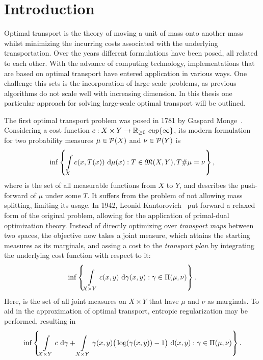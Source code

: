 \chapter*{Introduction}

Optimal transport is the theory of moving a unit of mass onto another mass whilst minimizing the incurring costs associated with the underlying transportation. Over the years different formulations have been posed, all related to each other. With the advance of computing technology, implementations that are based on optimal transport have entered application in various ways. One challenge this sets is the incorporation of large-scale problems, as previous algorithms do not scale well with increasing dimension. In this thesis one particular approach for solving large-scale optimal transport will be outlined.

The first optimal transport problem was posed in 1781 by Gaspard Monge\ \cite{Mon1781}. Considering a cost function $\map[c]{X \times Y}{\RZero \ cup \{ \infty \}}$, its modern formulation for two probability measures $\mu \in \PM{X}$ and $\nu \in \PM{Y}$ is
\[ \inf \left\{ \int\limits_X c(x, T(x))~\Dx{\mu} : T \in \MF{X}{Y}, \push{\mu} = \nu \right\}, \]
where  is the set of all measurable functions from $X$ to $Y$, and \push{\mu} describes the push-forward of $\mu$ under some $T$.
It suffers from the problem of not allowing mass splitting, limiting its usage. In 1942, Leonid Kantorovich\ \cite{Kan1942} put forward a relaxed form of the original problem, allowing for the application of primal-dual optimization theory. Instead of directly optimizing over \textit{transport maps} between two spaces, the objective now takes a joint measure, which attains the starting measures as its marginals, and assing a cost to the \textit{transport plan} by integrating the underlying cost function with respect to it:
\[ \inf \left\{ \int\limits_{X \times Y} c(x, y)~\Dx[x, y]{\gamma} : \gamma \in \TP{\mu}{\nu} \right\}. \]
Here, \TP{\mu}{\nu} is the set of all joint measures on $X \times Y$ that have $\mu$ and $\nu$ as marginals. To aid in the approximation of optimal transport, entropic regularization may be performed, resulting in
\[ \inf \left\{ \int\limits_{X \times Y} c~\D[\gamma] + \int\limits_{X \times Y} \gamma(x, y) \big( \log(\gamma(x, y)) - 1 \big)~\D[(x, y)] : \gamma \in \TP{\mu}{\nu} \right\}. \]

